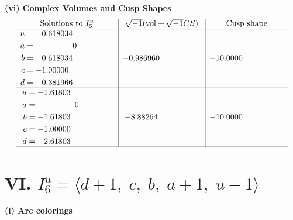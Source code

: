 \documentclass[1p]{elsarticle_modified}
\theoremstyle{definition}
\newcommand{\I}{\sqrt{-1}}
\begin{document}
\newpage\flushleft \textbf{(vi) Complex Volumes and Cusp Shapes}
$$\begin{array}{c|c|c}  
\text{Solutions to }I^u_{5}& \I (\text{vol} + \sqrt{-1}CS) & \text{Cusp shape}\\
 \hline 
\begin{aligned}
u &= \phantom{-}0.618034\phantom{ +0.000000I} \\
a &= \phantom{-0.000000 } 0 \\
b &= \phantom{-}0.618034\phantom{ +0.000000I} \\
c &= -1.00000\phantom{ +0.000000I} \\
d &= \phantom{-}0.381966\phantom{ +0.000000I}\end{aligned}
 & -0.986960\phantom{ +0.000000I} & -10.0000\phantom{ +0.000000I} \\ \hline\begin{aligned}
u &= -1.61803\phantom{ +0.000000I} \\
a &= \phantom{-0.000000 } 0 \\
b &= -1.61803\phantom{ +0.000000I} \\
c &= -1.00000\phantom{ +0.000000I} \\
d &= \phantom{-}2.61803\phantom{ +0.000000I}\end{aligned}
 & -8.88264\phantom{ +0.000000I} & -10.0000\phantom{ +0.000000I}\\
 \hline 
 \end{array}$$\newpage\newpage\renewcommand{\arraystretch}{1}
\centering \section*{VI. $I^u_{6}= \langle d+1,\;c,\;b,\;a+1,\;u-1 \rangle$}
\flushleft \textbf{(i) Arc colorings}\\
\end{document}
